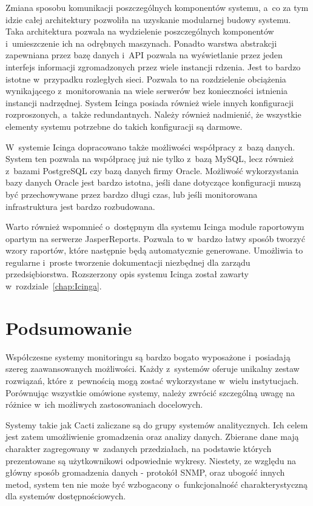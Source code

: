Zmiana sposobu komunikacji poszczególnych komponentów systemu, a~co za
tym idzie całej architektury pozwoliła na uzyskanie modularnej budowy
systemu. Taka architektura pozwala na wydzielenie poszczególnych
komponentów i~umieszczenie ich na odrębnych maszynach. Ponadto warstwa
abstrakcji zapewniana przez bazę danych i~API pozwala na wyświetlanie
przez jeden interfejs informacji zgromadzonych przez wiele instancji
rdzenia. Jest to bardzo istotne w~przypadku rozległych sieci. Pozwala
to na rozdzielenie obciążenia wynikającego z~monitorowania na wiele
serwerów bez konieczności istnienia instancji nadrzędnej. System
Icinga posiada również wiele innych konfiguracji rozproszonych,
a~także redundantnych. Należy również nadmienić, że wszystkie elementy
systemu potrzebne do takich konfiguracji są darmowe.

W~systemie Icinga dopracowano także możliwości współpracy
z~bazą danych. System ten pozwala na współpracę już nie tylko z~bazą
MySQL, lecz również z~bazami PostgreSQL czy bazą danych firmy
Oracle. Możliwość wykorzystania bazy danych Oracle jest bardzo
istotna, jeśli dane dotyczące konfiguracji muszą być przechowywane
przez bardzo długi czas, lub jeśli monitorowana infrastruktura jest
bardzo rozbudowana.

Warto również wspomnieć o~dostępnym dla systemu Icinga module
raportowym opartym na serwerze
JasperReports\cite{www:JasperReports}. Pozwala to w~bardzo łatwy
sposób tworzyć wzory raportów, które następnie będą automatycznie
generowane. Umożliwia to regularne i~proste tworzenie dokumentacji
niezbędnej dla zarządu przedsiębiorstwa. Rozszerzony opis systemu
Icinga został zawarty w~rozdziale~\ref{chap:Icinga}.

\section[Podsumowanie][Podsumowanie]{Podsumowanie}

Współczesne systemy monitoringu są bardzo bogato wyposażone
i~posiadają szereg zaawansowanych możliwości. Każdy z~systemów oferuje
unikalny zestaw rozwiązań, które z~pewnością mogą zostać wykorzystane
w~wielu instytucjach. Porównując wszystkie omówione systemy, należy
zwrócić szczególną uwagę na różnice w~ich możliwych zastosowaniach
docelowych.

Systemy takie jak Cacti zaliczane są do grupy systemów
analitycznych. Ich celem jest zatem umożliwienie gromadzenia oraz
analizy danych. Zbierane dane mają charakter zagregowany w~zadanych
przedziałach, na podstawie których prezentowane są użytkownikowi
odpowiednie wykresy. Niestety, ze względu na główny sposób gromadzenia
danych - protokół SNMP, oraz ubogość innych metod, system ten nie może
być wzbogacony o~funkcjonalność charakterystyczną dla systemów
dostępnościowych.

